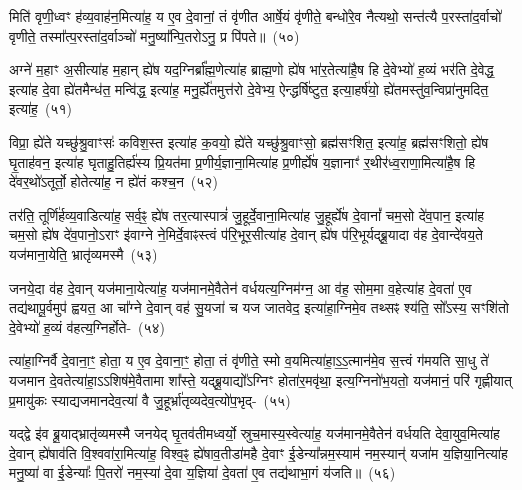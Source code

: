 मिति॑ वृणी॒ध्वꣳ ह॑व्य॒वाह॑न॒मित्या॑ह॒ य ए॒व दे॒वानां॒ तं वृ॑णीत आर्\mbox{}षे॒यं वृ॑णीते॒ बन्धो॑रे॒व नैत्यथो॒ सन्त॑त्यै प॒रस्ता॑द॒र्वाचो॑ वृणीते॒ तस्मा᳚त्प॒रस्ता॑द॒र्वाञ्चो॑ मनु॒ष्या᳚न्पि॒तरो\-ऽनु॒ प्र पि॑पते॥~(५०)

{\anuvakamend[{अशा᳚न्तावाह॒ पञ्च॑दशाब्रवी॒दन्वा॑है॒तया॑ वरिष्यते॒ मामेका॒न्नत्रि॒ꣳ॒शच्च॑}]}%

अग्ने॑ म॒हाꣳ अ॒सीत्या॑ह म॒हान् ह्ये॑ष यद॒ग्निर्ब्रा᳚ह्म॒णेत्या॑ह ब्राह्म॒णो ह्ये॑ष भा॑र॒तेत्या॑है॒ष हि दे॒वेभ्यो॑ ह॒व्यं भर॑ति दे॒वेद्ध॒ इत्या॑ह दे॒वा ह्ये॑तमैन्ध॑त॒ मन्वि॑द्ध॒ इत्या॑ह॒ मनु॒र्ह्ये॑तमुत्त॑रो दे॒वेभ्य॒ ऐन्द्धर्\mbox{}षि॑ष्टुत॒ इत्या॒हर्\mbox{}ष॑यो॒ ह्ये॑तमस्तु॑व॒न्विप्रा॑नुमदित॒ इत्या॑ह॒~(५१)

विप्रा॒ ह्ये॑ते यच्छु॑श्रु॒वाꣳसः॑ कविश॒स्त इत्या॑ह क॒वयो॒ ह्ये॑ते यच्छु॑श्रु॒वाꣳसो॒ ब्रह्म॑सꣳशित॒ इत्या॑ह॒ ब्रह्म॑सꣳशितो॒ ह्ये॑ष घृ॒ताह॑वन॒ इत्या॑ह घृताहु॒तिर्\mbox{}ह्य॑स्य प्रि॒यत॑मा प्र॒णीर्य॒ज्ञाना॒मित्या॑ह प्र॒णीर्\mbox{}ह्ये॑ष य॒ज्ञानाꣳ॑ र॒थीर॑ध्व॒राणा॒मित्या॑है॒ष हि दे॑वर॒थो॑\-ऽतूर्तो॒ होतेत्या॑ह॒ न ह्ये॑तं कश्च॒न~(५२)

तर॑ति॒ तूर्णि॑र्\mbox{}हव्य॒वाडित्या॑ह॒ सर्व॒ꣴ॒ ह्ये॑ष तर॒त्यास्पात्रं॑ जु॒हूर्दे॒वा\-ना॒\-मि\-त्या॑ह जु॒हूर्\mbox{}ह्ये॑ष दे॒वानां᳚ चम॒सो दे॑व॒पान॒ इत्या॑ह चम॒सो ह्ये॑ष दे॑व॒पानो॒\-ऽराꣳ इ॑वाग्ने ने॒मिर्दे॒वाꣴस्त्वं प॑रि॒भूर॒सीत्या॑ह दे॒वान् ह्ये॑ष प॑रि॒\-भूर्यद्ब्रू॒\-यादा व॑ह दे॒वान्दे॑वय॒ते यज॑माना॒येति॒ भ्रातृ॑व्यमस्मै~(५३)

जनये॒दा व॑ह दे॒वान् यज॑माना॒येत्या॑ह॒ यज॑मानमे॒वैतेन॑ वर्ध\-य\-त्य॒\-ग्नि\-म॑ग्न॒ आ व॑ह॒ सोम॒मा व॒हेत्या॑ह दे॒वता॑ ए॒व तद्य॑थापू॒र्वमुप॑ ह्वयत॒ आ चा᳚ग्ने दे॒वान् वह॑ सु॒यजा॑ च यज जातवेद॒ इत्या॑हा॒ग्निमे॒व तथ्सꣴ श्य॑ति॒ सो᳚\-ऽस्य॒ सꣳशि॑तो दे॒वेभ्यो॑ ह॒व्यं व॑हत्य॒ग्निर्\mbox{}होते-~(५४)

त्या॑हा॒ग्निर्वै दे॒वाना॒ꣳ॒ होता॒ य ए॒व दे॒वाना॒ꣳ॒ होता॒ तं वृ॑णीते॒ स्मो व॒यमित्या॑हा॒\-ऽ॒\-ऽ॒त्मान॑मे॒व स॒त्त्वं ग॑मयति सा॒धु ते॑ यजमान दे॒वतेत्या॑हा॒\-ऽऽ\-शिष॑मे॒वैतामा शा᳚स्ते॒ यद्ब्रू॒याद्यो᳚\-ऽग्निꣳ होता॑र॒मवृ॑था॒ इत्य॒ग्निनो॑भ॒यतो॒ यज॑मानं॒ परि॑ गृह्णीयात् प्र॒मायु॑कः स्याद्यजमानदेव॒त्या॑ वै जु॒हूर्भ्रा॑तृव्यदेव॒त्यो॑प॒भृद्-~(५५)

यद्द्वे इ॑व ब्रू॒याद्भ्रातृ॑व्यमस्मै जनयेद् घृ॒तव॑तीमध्वर्यो॒ स्रुच॒मास्य॒\-स्वे\-त्या॑ह॒ यज॑मानमे॒वैतेन॑ वर्धयति देवा॒युव॒मित्या॑ह दे॒वान् ह्ये॑षा\-व॑ति वि॒श्व\-वा॑रा॒मित्या॑ह॒ विश्व॒ꣴ॒ ह्ये॑षाव॒तीडा॑महै दे॒वाꣳ ई॒डेन्या᳚न्नम॒स्याम॑ नम॒स्यान्॑ यजा॑म य॒ज्ञिया॒नित्या॑ह मनु॒ष्या॑ वा ई॒डेन्याः᳚ पि॒तरो॑ नम॒स्या॑ दे॒वा य॒ज्ञिया॑ दे॒वता॑ ए॒व तद्य॑थाभा॒गं य॑जति॥~(५६)

